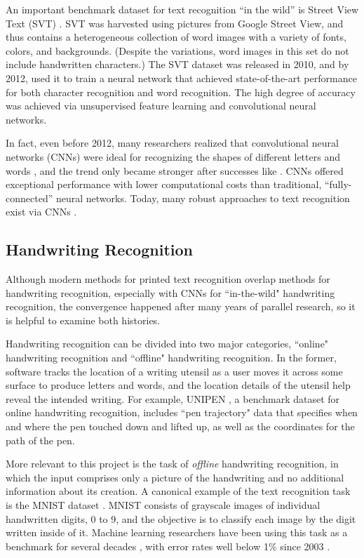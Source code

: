 \documentclass[final]{ukthesis}
\begin{document}
An important benchmark dataset for text recognition ``in the wild'' is Street View Text (SVT) \cite{wang2010word}. SVT was harvested using pictures from Google Street View, and thus contains a heterogeneous collection of word images with a variety of fonts, colors, and backgrounds. (Despite the variations, word images in this set do not include handwritten characters.) The SVT dataset was released in 2010, and by 2012, \cite{wang2012end} used it to train a neural network that achieved state-of-the-art performance for both character recognition and word recognition. The high degree of accuracy was achieved via unsupervised feature learning and convolutional neural networks.

In fact, even before 2012, many researchers realized that convolutional neural networks (CNNs) were ideal for recognizing the shapes of different letters and words \cite{saidane2007automatic,delakis2008text}, and the trend only became stronger after successes like \cite{wang2012end}. CNNs offered exceptional performance with lower computational costs than traditional, ``fully-connected'' neural networks. Today, many robust approaches to text recognition exist via CNNs \cite{wang2012end,yin2014robust,jaderberg2016reading}.


\subsection{Handwriting Recognition}
Although modern methods for printed text recognition overlap methods for handwriting recognition, especially with CNNs for ``in-the-wild" handwriting recognition, the convergence happened after many years of parallel research, so it is helpful to examine both histories.

Handwriting recognition can be divided into two major categories, ``online" handwriting recognition and ``offline" handwriting recognition. In the former, software tracks the location of a writing utensil as a user moves it across some surface to produce letters and words, and the location details of the utensil help reveal the intended writing. For example, UNIPEN \cite{guyon1994unipen}, a benchmark dataset for online handwriting recognition, includes ``pen trajectory" data that specifies when and where the pen touched down and lifted up, as well as the coordinates for the path of the pen.

More relevant to this project is the task of {\em offline} handwriting recognition, in which the input comprises only a picture of the handwriting and no additional information about its creation. A canonical example of the text recognition task is the MNIST dataset \cite{lecun1998mnist}. MNIST consists of grayscale images of individual handwritten digits, 0 to 9, and the objective is to classify each image by the digit written inside of it. Machine learning researchers have been using this task as a benchmark for several decades \cite{bottou1994comparison}, with error rates well below 1\% since 2003 \cite{kussul2004improved}.
\end{document}
